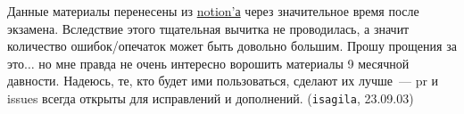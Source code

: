 Данные материалы перенесены из
\href{https://awes0me.notion.site/EX-01-c7434ef4efff4e898b176c418202c956?pvs=4}
{notion'а} через значительное время после экзамена. Вследствие этого тщательная
вычитка не проводилась, а значит количество ошибок/опечаток может быть довольно
большим. Прошу прощения за это\(\dotsc\) но мне правда не очень интересно
ворошить материалы 9 месячной давности. Надеюсь, те, кто будет ими пользоваться,
сделают их лучше~--- pr и issues всегда открыты для исправлений и дополнений.
(\texttt{isagila}, 23.09.03)
